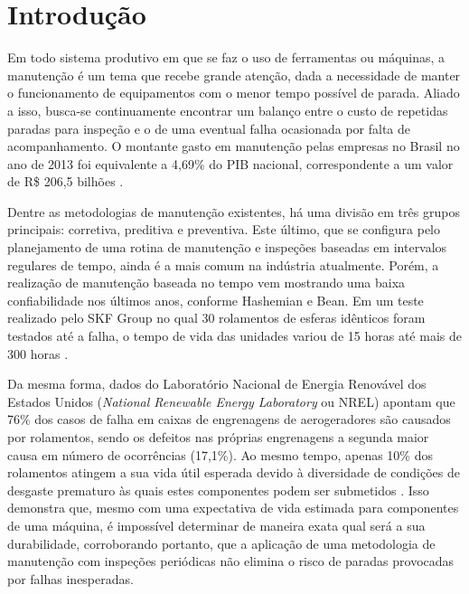 \documentclass[12pt,openright,oneside,a4paper,
	chapter=TITLE,section=TITLE,
	english,brazil]{abntex2}
\begin{document}
	
	\textual %
	
	\chapter{Introdução}
	Em todo sistema produtivo em que se faz o uso de ferramentas ou máquinas, a manutenção é um tema que recebe grande atenção, dada a necessidade de manter o funcionamento de equipamentos com o menor tempo possível de parada. Aliado a isso, busca-se continuamente encontrar um balanço entre o custo de repetidas paradas para inspeção e o de uma eventual falha ocasionada por falta de acompanhamento. O montante gasto em manutenção pelas empresas no Brasil no ano de 2013 foi equivalente a 4,69\% do PIB nacional, correspondente a um valor de R\$ 206,5 bilhões \cite{seleme:2015}.
	
	Dentre as metodologias de manutenção existentes, há uma divisão em três grupos principais: corretiva, preditiva e preventiva. Este último, que se configura pelo planejamento de uma rotina de manutenção e inspeções baseadas em intervalos regulares de tempo, ainda é a mais comum na indústria atualmente. Porém, a realização de manutenção baseada no tempo vem mostrando uma baixa confiabilidade nos últimos anos, conforme Hashemian e Bean. Em um teste realizado pelo SKF Group no qual 30 rolamentos de esferas idênticos foram testados até a falha, o tempo de vida das unidades variou de 15 horas até mais de 300 horas \cite{hashemian:2011}.  
	
	Da mesma forma, dados do Laboratório Nacional de Energia Renovável dos Estados Unidos (\textit{\foreignlanguage{english}{National Renewable Energy Laboratory}} ou NREL) apontam que 76\% dos casos de falha em caixas de engrenagens de aerogeradores são causados por rolamentos, sendo os defeitos nas próprias engrenagens a segunda maior causa em número de ocorrências (17,1\%). Ao mesmo tempo, apenas 10\% dos rolamentos atingem a sua vida útil esperada devido à diversidade de condições de desgaste prematuro às quais estes componentes podem ser submetidos \cite{peeters:2017}. Isso demonstra que, mesmo com uma expectativa de vida estimada para componentes de uma máquina, é impossível determinar de maneira exata qual será a sua durabilidade, corroborando portanto, que a aplicação de uma metodologia de manutenção com inspeções periódicas não elimina o risco de paradas provocadas por falhas inesperadas.
	
\end{document}
